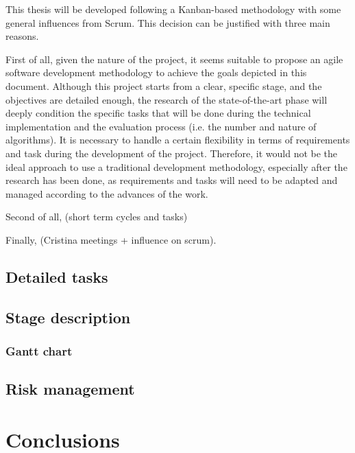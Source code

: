 \documentclass[a4paper]{article}
\begin{document}
This thesis will be developed following a Kanban-based methodology with some general influences from Scrum. This decision can be justified with three main reasons.

First of all, given the nature of the project, it seems suitable to propose an agile software development methodology to achieve the goals depicted in this document. Although this project starts from a clear, specific stage, and the objectives are detailed enough, the research of the state-of-the-art phase will deeply condition the specific tasks that will be done during the technical implementation and the evaluation process (i.e. the number and nature of algorithms). It is necessary to handle a certain flexibility in terms of requirements and task during the development of the project. Therefore, it would not be the ideal approach to use a traditional development methodology, especially after the research has been done, as requirements and tasks will need to be adapted and managed according to the advances of the work.

Second of all, (short term cycles and tasks)

Finally, (Cristina meetings + influence on scrum).

\subsection{Detailed tasks}

\subsection{Stage description}

\subsubsection{Gantt chart}

\subsection{Risk management}

\section{Conclusions}
\end{document}
